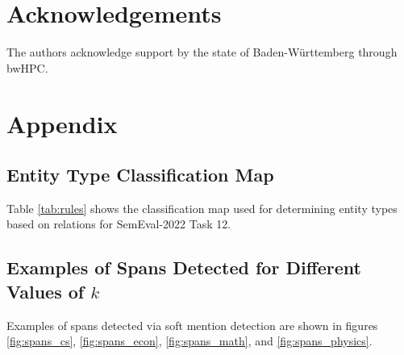 \documentclass[11pt]{article}
\begin{document}
\section*{Acknowledgements}


The authors acknowledge support by the state of Baden-Württemberg through bwHPC.




\appendix

\section{Appendix}
\label{sec:appendix}

\subsection{Entity Type Classification Map}
\label{sec:appendix_a}


Table \ref{tab:rules} shows the classification map used for determining entity types based on relations for SemEval-2022 Task 12.

\begin{table}[h]
\centering
{}
\caption{\label{tab:rules}Classification map for entity types based on relations in which the spans participate. *In a postprocessing step, entity types of spans which are the head entity of multiple "Direct" relations are adjusted to "ORDERED".}
\end{table}



\subsection{Examples of Spans Detected for Different Values of $k$}
\label{sec:appendix_b}
Examples of spans detected via soft mention detection are shown in figures \ref{fig:spans_cs}, \ref{fig:spans_econ}, \ref{fig:spans_math}, and \ref{fig:spans_physics}.
\end{document}
